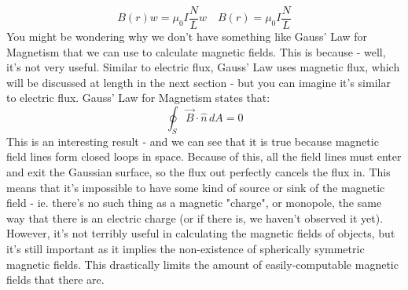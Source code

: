 \[
	B(r) w =  \mu_0 I \frac{N}{L} w \quad
	B(r) = \mu_0 I \frac{N}{L}
\]
You might be wondering why we don't have something like Gauss' Law for Magnetism that we can use to calculate magnetic fields. This is because - well, it's not very useful. Similar to electric flux, Gauss' Law uses magnetic flux, which will be discussed at length in the next section - but you can imagine it's similar to electric flux. Gauss' Law for Magnetism states that:
\[
	\oint_S \vec B \cdot \hat n \, dA = 0
\]
This is an interesting result - and we can see that it is true because magnetic field lines form closed loops in space. Because of this, all the field lines must enter and exit the Gaussian surface, so the flux out perfectly cancels the flux in. This means that it's impossible to have some kind of source or sink of the magnetic field - ie. there's no such thing as a magnetic "charge", or monopole, the same way that there is an electric charge (or if there is, we haven't observed it yet). However, it's not terribly useful in calculating the magnetic fields of objects, but it's still important as it implies the non-existence of spherically symmetric magnetic fields. This drastically limits the amount of easily-computable magnetic fields that there are. 
